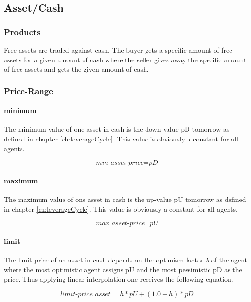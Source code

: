\documentclass[Bachelorarbeit.tex]{subfiles}
\begin{document}
\subsection{Asset/Cash}
\subsubsection{Products}
Free assets are traded against cash. The buyer gets a specific amount of free assets for a given amount of cash where the seller gives away the specific amount of free assets and gets the given amount of cash.

\subsubsection{Price-Range}

\paragraph{minimum}
The minimum value of one asset in cash is the down-value pD tomorrow as defined in chapter \ref{ch:leverageCycle}. This value is obviously a constant for all agents.

\begin{equation}
\textit{min asset-price} = \textit{pD}
\end{equation}

\paragraph{maximum}
The maximum value of one asset in cash is the up-value pU tomorrow as defined in chapter \ref{ch:leverageCycle}. This value is obviously a constant for all agents.

\begin{equation}
\textit{max asset-price} = \textit{pU}
\end{equation}

\paragraph{limit}
The limit-price of an asset in cash depends on the optimism-factor \textit{h} of the agent where the most optimistic agent assigns pU and the most pessimistic pD as the price. Thus applying linear interpolation one receives the following equation.

\begin{equation}
\textit{limit-price asset} = h * pU + ( 1.0 - h ) * pD
\end{equation}
\end{document}
